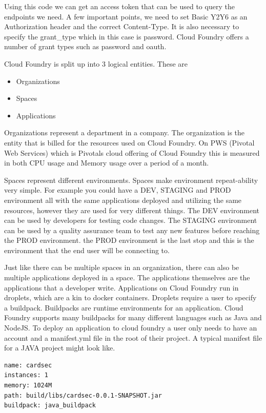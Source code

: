 Using this code we can get an access token that can be used to query the endpoints we need. A few important points, we need to set Basic Y2Y6 as an Authorization header and the correct Content-Type. It is also necessary to specify the grant\_type which in this case is password. Cloud Foundry offers a number of grant types such as password and oauth. 

Cloud Foundry is split up into 3 logical entities. These are

\begin{itemize}
  \item Organizations
  \item Spaces
  \item Applications
\end{itemize}

Organizations represent a department in a company. The organization is the entity that is billed for the resources used on Cloud Foundry. On PWS (Pivotal Web Services) which is Pivotals cloud offering of Cloud Foundry this is measured in both CPU usage and Memory usage over a period of a month.

Spaces represent different environments. Spaces make environment repeat-ability very simple. For example you could have a DEV, STAGING and PROD environment all with the same applications deployed and utilizing the same resources, however they are used for very different things. The DEV environment can be used by developers for testing code changes. The STAGING environment can be used by a quality assurance team to test any new features before reaching the PROD environment. the PROD environment is the last stop and this is the environment that the end user will be connecting to.

Just like there can be multiple spaces in an organization, there can also be multiple applications deployed in a space. The applications themselves are the applications that a developer write. Applications on Cloud Foundry run in droplets, which are a kin to docker containers. Droplets require a user to specify a buildpack. Buildpacks are runtime environments for an application. Cloud Foundry supports many buildpacks for many different languages such as Java and NodeJS. To deploy an application to cloud foundry a user only needs to have an account and a manifest.yml file in the root of their project. A typical manifest file for a JAVA project might look like.

\begin{verbatim}
name: cardsec
instances: 1
memory: 1024M
path: build/libs/cardsec-0.0.1-SNAPSHOT.jar
buildpack: java_buildpack
\end{verbatim}

